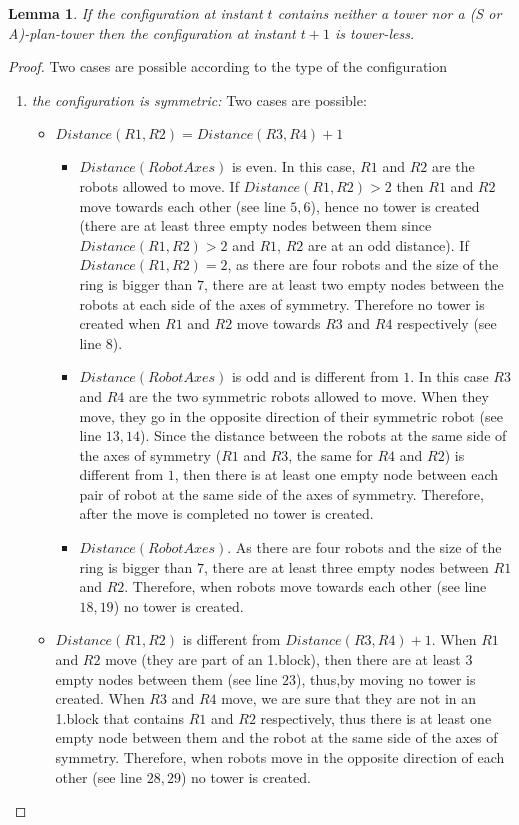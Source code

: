 \documentclass[12pt]{llncs}
\newtheorem{lem}{Lemma}
\begin{document}
\begin{lem}
If the configuration at instant $t$ contains neither a tower nor a (S or A)-plan-tower then the configuration at instant $t+1$ is tower-less.
\end{lem}

\begin{proof}
Two cases are possible according to the type of the configuration

\begin{enumerate}
\item{\textit{the configuration is symmetric:}}  Two cases are possible:
\begin{itemize}
\item {$Distance(R1,R2)= Distance(R3,R4)+1$}
\begin{itemize}
\item{$Distance(RobotAxes)$ is even}. In this case, $R1$ and $R2$ are the robots allowed to move. If $Distance(R1,R2)>2$ then $R1$ and $R2$ move towards each other (see line $5,6$), hence no tower is created (there are at least three empty nodes between them since $Distance(R1,R2)>2$ and $R1$, $R2$ are at an odd distance). If $Distance(R1,R2)=2$, as there are four robots and the size of the ring is bigger than $7$, there are at least two empty nodes between the robots at each side of the axes of symmetry. Therefore no tower is created when $R1$ and $R2$ move towards $R3$ and $R4$ respectively (see line $8$). 

\item{$Distance(RobotAxes)$ is odd and is different from $1$}. In this case $R3$ and $R4$ are the two symmetric robots allowed to move. When they move, they go in the opposite direction of their symmetric robot (see line $13,14$). Since the distance between the robots at the same side of the axes of symmetry ($R1$ and $R3$, the same for $R4$ and $R2$) is different from $1$, then there is at least one empty node between each pair of robot at the same side of the axes of symmetry. Therefore, after the move is completed no tower is created.

\item{$Distance(RobotAxes)$}. As there are four robots and the size of the ring is bigger than $7$, there are at least three empty nodes between $R1$ and $R2$. Therefore, when robots move towards each other (see line $18,19$) no tower is created.
\end{itemize}

\item {$Distance(R1,R2)$ is different from $Distance(R3,R4)+1$}. When $R1$ and $R2$ move (they are part of an 1.block), then there are at least $3$ empty nodes between them (see line $23$), thus,by moving no tower is created. When $R3$ and $R4$ move, we are sure that they are not in an 1.block that contains $R1$ and $R2$ respectively, thus there is at least one empty node between them and the robot at the same side of the axes of symmetry. Therefore,  when robots move in the opposite direction of each other (see line $28,29$) no tower is created.


\end{itemize}
\end{enumerate}
\end{proof}
\end{document}

